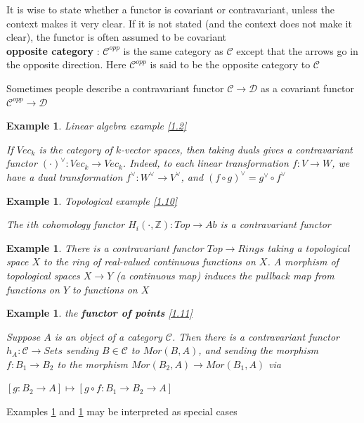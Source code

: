 \documentclass{article}
\newtheorem{example}[theorem]{Example}
\begin{document}
It is wise to state whether a functor is covariant or contravariant, unless the context makes it very clear. If it is not stated (and the context does not make it
clear), the functor is often assumed to be covariant\\

\textbf{opposite category} : $\mathscr C^{opp}$ is the same category as $\mathscr C$ except that the arrows go in the opposite direction. Here $\mathscr C^{opp}$ is said to be the opposite category to $\mathscr C$

Sometimes people describe a contravariant functor $\mathscr C \rightarrow \mathscr D$ as a covariant functor $\mathscr C^{opp} \rightarrow \mathscr D$

\begin{example}
    Linear algebra example \ref{1.2}
    
    If $Vec_k$ is the category of $k$-vector spaces, then taking duals gives a contravariant functor $(·) ^\vee: Vec_k \rightarrow Vec_k$. Indeed, to each linear transformation $f : V \rightarrow W$, we have a dual transformation $f^\vee : W^\vee \rightarrow V^\vee$, and $(f \circ g)^\vee = g^\vee \circ f^\vee$
    \label{1.13}
\end{example}
\begin{example}
    Topological example \ref{1.10}
    
    The $i$th cohomology functor $H_i(\cdot, \mathbb Z) : Top \rightarrow Ab$ is a contravariant functor
\end{example}
\begin{example}
    There is a contravariant functor $Top \rightarrow Rings$ taking a topological space $X$ to the ring of real-valued continuous functions on $X$. A morphism of topological spaces $X \rightarrow Y$ (a continuous map) induces the pullback map from functions on $Y$ to functions on $X$
    \label{1.15}
\end{example}
\begin{example}
     the \textbf{functor of points} \ref{1.11}
     
     Suppose $A$ is an object of a category $\mathscr C$. Then there is a contravariant functor $h_A : \mathscr C \rightarrow Sets$ sending $B \in \mathscr C$ to $Mor(B, A)$, and sending the morphism $f : B_1 \rightarrow B_2$ to the morphism $Mor(B_2, A) \rightarrow Mor(B_1, A)$ via
     \begin{center}
         $[g: B_2 \rightarrow A] \mapsto [g \circ f : B_1 \rightarrow B_2 \rightarrow A]$
     \end{center}
\end{example}
 Examples \ref{1.13} and \ref{1.15} may be interpreted as special cases\\
\end{document}
